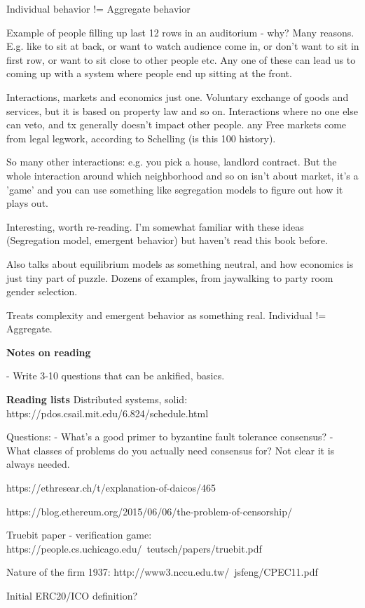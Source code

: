 \documentclass[12pt]{report}
\begin{document}
Individual behavior != Aggregate behavior

Example of people filling up last 12 rows in an auditorium - why? Many reasons.
E.g. like to sit at back, or want to watch audience come in, or don't want to
sit in first row, or want to sit close to other people etc. Any one of these can
lead us to coming up with a system where people end up sitting at the front.

Interactions, markets and economics just one. Voluntary exchange of goods and
services, but it is based on property law and so on. Interactions where no one
else can veto, and tx generally doesn't impact other people. any Free markets
come from legal legwork, according to Schelling (is this 100%
history).

So many other interactions: e.g. you pick a house, landlord contract. But the
whole interaction around which neighborhood and so on isn't about market, it's a
'game' and you can use something like segregation models to figure out how it
plays out.

Interesting, worth re-reading. I'm somewhat familiar with these ideas
(Segregation model, emergent behavior) but haven't read this book before.

Also talks about equilibrium models as something neutral, and how economics is
just tiny part of puzzle. Dozens of examples, from jaywalking to party room gender
selection.

Treats complexity and emergent behavior as something real. Individual != Aggregate.

\textbf{Notes on reading}

- Write 3-10 questions that can be ankified, basics.


\textbf{Reading lists}
Distributed systems, solid: https://pdos.csail.mit.edu/6.824/schedule.html


Questions:
- What's a good primer to byzantine fault tolerance consensus?
- What classes of problems do you actually need consensus for? Not clear it is always needed.

https://ethresear.ch/t/explanation-of-daicos/465

https://blog.ethereum.org/2015/06/06/the-problem-of-censorship/

Truebit paper - verification game: https://people.cs.uchicago.edu/~teutsch/papers/truebit.pdf

Nature of the firm 1937: http://www3.nccu.edu.tw/~jsfeng/CPEC11.pdf

Initial ERC20/ICO definition?
\end{document}
